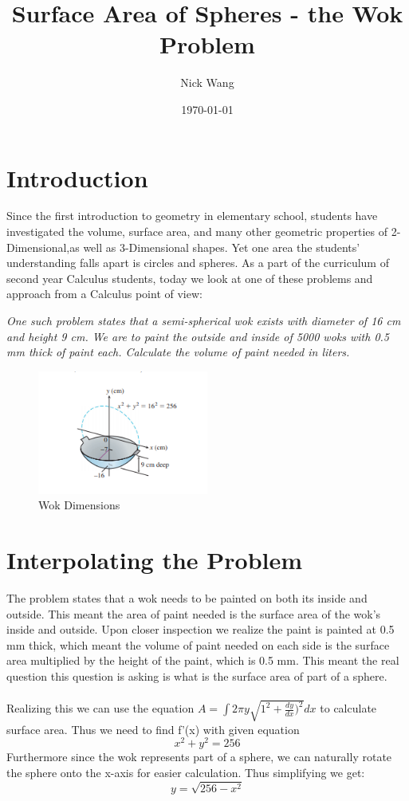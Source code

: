 \documentclass[a4paper, 12pt]{article}
\begin{document}
	
	\title{Surface Area of Spheres - the Wok Problem}
		\author{Nick Wang}
		\date{\today}
	\maketitle
	
	\section{Introduction}
		Since the first introduction to geometry in elementary school, students have investigated the volume, surface area, and many other geometric properties of 2-Dimensional,as well as 3-Dimensional shapes. Yet one area the students' understanding falls apart is circles and spheres. As a part of the curriculum of second year Calculus students, today we look at one of these problems and approach from a Calculus point of view:\\
		\begin{center}
			\textit {One such problem states that a semi-spherical wok exists with diameter of 16 cm and height 9 cm. We are to paint the outside and inside of 5000 woks with 0.5 mm thick of paint each. Calculate the volume of paint needed in liters. }\\
		\end{center}
		\begin{figure}[h]
			\centering
			\includegraphics[width=0.5\textwidth]{wok.png}
			\caption{Wok Dimensions}
		\end{figure}
	
	\section{Interpolating the Problem}
		\label{interpolation}
		The problem states that a wok needs to be painted on both its inside and outside. This meant the area of paint needed is the surface area of the wok's inside and outside. Upon closer inspection we realize the paint is painted at 0.5 mm thick, which meant the volume of paint needed on each side is the surface area multiplied by the height of the paint, which is 0.5 mm. This meant the  real question this question is asking is what is the surface area of part of a sphere.\\\\
		Realizing this we can use the equation $A = \int2\pi y\sqrt{1^2+\frac{dy}{dx})^2}dx$ to calculate surface area. Thus we need to find f'(x) with given equation $$x^2+y^2=256$$Furthermore since the wok represents part of a sphere, we can naturally rotate the sphere onto the x-axis for easier calculation. Thus simplifying we get:$$y=\sqrt{256-x^2}$$
\end{document}
